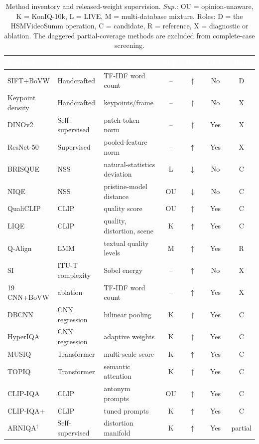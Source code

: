 \documentclass[sn-basic,Numbered]{sn-jnl}
\newcommand{\hd}[1]{\textcolor{white}{\textbf{#1}}}
\newcommand{\polup}{\ensuremath{\uparrow}}
\newcommand{\poldown}{\ensuremath{\downarrow}}
\begin{document}
\begin{table}[!ht]
\centering
\caption{Method inventory and released-weight supervision. \emph{Sup.}:
OU = opinion-unaware, K = KonIQ-10k, L = LIVE, M = multi-database mixture.
Roles: D = the HSMVideoSumm operation, C = candidate, R = reference,
X = diagnostic or ablation. The daggered partial-coverage methods are excluded from
complete-case screening.}
\label{tab:methods_supp}
\scriptsize
\setlength{\tabcolsep}{2.5pt}
\begin{tabular}{@{}p{2.0cm}p{2.0cm}p{3.0cm}cccc@{}}
\toprule
\rowcolor{headerblue}
\hd{Method} & \hd{Family} & \hd{Construct} & \hd{Sup.} & \hd{Pol.} & \hd{GPU} & \hd{Role} \\
\midrule
SIFT+BoVW & Handcrafted & TF-IDF word count & -- & \polup & No & D \\
Keypoint density & Handcrafted & keypoints/frame & -- & \polup & No & X \\
DINOv2 & Self-supervised & patch-token norm & -- & \polup & Yes & X \\
ResNet-50 & Supervised & pooled-feature norm & -- & \polup & Yes & X \\
BRISQUE & NSS & natural-statistics deviation & L & \poldown & No & C \\
NIQE & NSS & pristine-model distance & OU & \poldown & No & C \\
QualiCLIP & CLIP & quality score & OU & \polup & Yes & C \\
LIQE & CLIP & quality, distortion, scene & K & \polup & Yes & C \\
Q-Align & LMM & textual quality levels & M & \polup & Yes & R \\
SI & ITU-T complexity & Sobel energy & -- & \polup & No & X \\
19 CNN+BoVW & ablation & TF-IDF word count & -- & \polup & Yes & X \\
DBCNN & CNN regression & bilinear pooling & K & \polup & Yes & C \\
HyperIQA & CNN regression & adaptive weights & K & \polup & Yes & C \\
MUSIQ & Transformer & multi-scale score & K & \polup & Yes & C \\
TOPIQ & Transformer & semantic attention & K & \polup & Yes & C \\
CLIP-IQA & CLIP & antonym prompts & OU & \polup & Yes & C \\
CLIP-IQA$+$ & CLIP & tuned prompts & K & \polup & Yes & C \\
ARNIQA$^{\dagger}$ & Self-supervised & distortion manifold & K & \polup & Yes & partial \\

\end{tabular}
\end{table}
\end{document}
